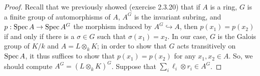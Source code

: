\begin{proof}
	Recall that we previously showed (exercise 2.3.20) that if $A$ is a ring, $G$ is a finite group of automorphisms of $A$, $A^G$ is the invariant subring, and $p : \operatorname{Spec} A \to \operatorname{Spec} A^G$ the morphism induced by $A^G \hookrightarrow A$, then $p(x_1) = p(x_2)$ if and only if there is a $\sigma \in G$ such that $\sigma(x_1) = x_2$.
	In our case, $G$ is the Galois group of $K/k$ and $A = L \otimes_k K$; in order to show that $G$ acts transitively on $\operatorname{Spec} A$, it thus suffices to show that $p(x_1) = p(x_2)$ for any $x_1,x_2 \in A$. So, we should compute $A^G = (L \otimes_k K)^G$. Suppose that $\sum_i \ell_i \otimes r_i \in A^G$. 
\end{proof}
